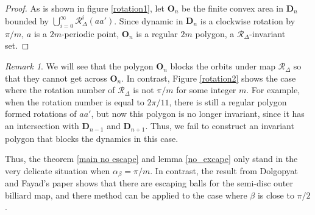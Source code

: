 \documentclass{article}
\numberwithin{figure}{section}
\numberwithin{equation}{section}
\theoremstyle{remark}
\newtheorem*{remark}{Remark}
\theoremstyle{definition}
\begin{document}
\begin{proof}
	
	As is shown in figure \ref*{rotation1},	let $\textbf{O}_{n}$ be the finite convex area in $\textbf{D}_{n}$ bounded by $\bigcup_{i=0}^{\infty}{\mathcal{R}_\Delta^i(aa')}$. Since dynamic in $\textbf{D}_{n}$ is a clockwise rotation by $\pi/m$, $a$ is a $2m$-periodic point, $\textbf{O}_{n}$ is a  regular $2m$ polygon, a $\mathcal{R}_\Delta$-invariant set. 
	\end{proof}
	
\begin{remark}
	We will see that the polygon $\textbf{O}_n$ blocks the orbits under map $\mathcal{R}_\Delta$ so that they cannot get across $\textbf{O}_n$.
	In contrast, Figure \ref{rotation2} shows the case where the rotation number of $\mathcal{R}_\Delta$ is not $\pi/m$ for some integer $m$. For example, when the rotation number is equal to $2\pi/11$, there is still a regular polygon formed rotations of $aa'$, but now this polygon is no longer invariant, since it has an intersection with $\textbf{D}_{n-1}$ and $\textbf{D}_{n+1}$. Thus, we fail to construct an invariant polygon that blocks the dynamics in this case.
	
	Thus, the theorem \ref{main no escape} and lemma \ref{no_excape} only stand in the very delicate situation when $\alpha_\beta=\pi/m$. In contrast, the result from Dolgopyat and Fayad's paper \cite{dolgopyat_unbounded_2009} shows that there are escaping balls for the semi-disc outer billiard map, and there method can be applied to the case where $\beta$ is close to $\pi/2$.
\end{remark}
\end{document}
